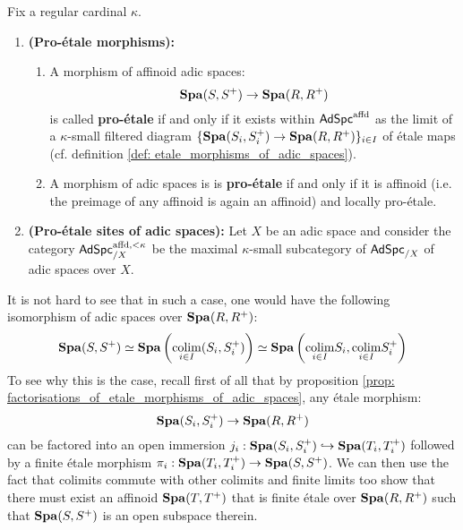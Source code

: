                 \begin{definition} \label{def: pro_etale_topology_on_adic_spaces}
                    Fix a regular cardinal $\kappa$.
                        \begin{enumerate}
                            \item \textbf{(Pro-\'etale morphisms):} 
                                \begin{enumerate}
                                    \item A morphism of affinoid adic spaces:
                                        $$\mathbf{Spa}(S, S^+) \to \mathbf{Spa}(R, R^+)$$
                                    is called \textbf{pro-\'etale} if and only if it exists within $\mathsf{Ad}\mathsf{Spc}^{\mathrm{affd}}$ as the limit of a $\kappa$-small filtered diagram $\{\mathbf{Spa}(S_i, S_i^+) \to \mathbf{Spa}(R, R^+)\}_{i \in I}$ of \'etale maps (cf. definition \ref{def: etale_morphisms_of_adic_spaces}). 
                                    \item A morphism of adic spaces is is \textbf{pro-\'etale} if and only if it is affinoid (i.e. the preimage of any affinoid is again an affinoid) and locally pro-\'etale.
                                \end{enumerate}
                            \item \textbf{(Pro-\'etale sites of adic spaces):} Let $X$ be an adic space and consider the category $\mathsf{Ad}\mathsf{Spc}^{\mathrm{affd}, < \kappa}_{/X}$ be the maximal $\kappa$-small subcategory of $\mathsf{Ad}\mathsf{Spc}_{/X}$ of adic spaces over $X$.
                        \end{enumerate}
                \end{definition}
                \begin{remark}
                    It is not hard to see that in such a case, one would have the following isomorphism of adic spaces over $\mathbf{Spa}(R, R^+)$:
                        $$\mathbf{Spa}(S, S^+) \simeq \mathbf{Spa}\left( \underset{i \in I}{\operatorname{colim}} (S_i, S_i^+) \right) \simeq \mathbf{Spa} \left(\underset{i \in I}{\operatorname{colim}} S_i, \underset{i \in I}{\operatorname{colim}} S_i^+\right)$$
                    To see why this is the case, recall first of all that by proposition \ref{prop: factorisations_of_etale_morphisms_of_adic_spaces}, any \'etale morphism:
                        $$\mathbf{Spa}(S_i, S_i^+) \to \mathbf{Spa}(R, R^+)$$
                    can be factored into an open immersion $j_i: \mathbf{Spa}(S_i, S_i^+) \hookrightarrow \mathbf{Spa}(T_i, T_i^+)$ followed by a finite \'etale morphism $\pi_i: \mathbf{Spa}(T_i, T_i^+) \to \mathbf{Spa}(S, S^+)$. We can then use the fact that colimits commute with other colimits and finite limits too show that there must exist an affinoid $\mathbf{Spa}(T, T^+)$ that is finite \'etale over $\mathbf{Spa}(R, R^+)$ such that $\mathbf{Spa}(S, S^+)$ is an open subspace therein.
                \end{remark}
                
